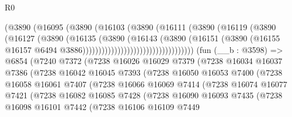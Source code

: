 \begin{lexlean}{R0}
\begin{coremodule}
                                      (@3890
                                        (@16095
                                          (@3890
                                            (@16103
                                              (@3890
                                                (@16111
                                                  (@3890
                                                    (@16119
                                                      (@3890
                                                        (@16127
                                                          (@3890
                                                            (@16135
                                                              (@3890
                                                                (@16143
                                                                  (@3890
                                                                    (@16151
                                                                      (@3890
                                                                        (@16155
                                                                          @16157
                                                                          @6494
                                                                          @3886)))))))))))))))))))))))))))))))))))
    (fun (__b : @3598) =>
    @6854
      (@7240
        @7372
        (@7238
          @16026
          @16029
          @7379
          (@7238
            @16034
            @16037
            @7386
            (@7238
              @16042
              @16045
              @7393
              (@7238
                @16050
                @16053
                @7400
                (@7238
                  @16058
                  @16061
                  @7407
                  (@7238
                    @16066
                    @16069
                    @7414
                    (@7238
                      @16074
                      @16077
                      @7421
                      (@7238
                        @16082
                        @16085
                        @7428
                        (@7238
                          @16090
                          @16093
                          @7435
                          (@7238
                            @16098
                            @16101
                            @7442
                            (@7238
                              @16106
                              @16109
                              @7449

\end{coremodule}
\end{lexlean}
